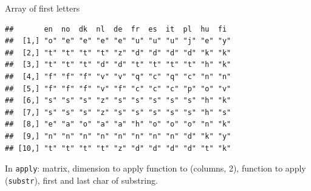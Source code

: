 \begin{frame}[fragile]{Array of first letters}

\begin{knitrout}\small
{}\color{fgcolor}\begin{kframe}
\begin{alltt}
\hlkwb{=}\hlstd{,}\hlstd{)}
\end{alltt}
\begin{verbatim}
##       en  no  dk  nl  de  fr  es  it  pl  hu  fi 
##  [1,] "o" "e" "e" "e" "e" "u" "u" "u" "j" "e" "y"
##  [2,] "t" "t" "t" "t" "z" "d" "d" "d" "d" "k" "k"
##  [3,] "t" "t" "t" "d" "d" "t" "t" "t" "t" "h" "k"
##  [4,] "f" "f" "f" "v" "v" "q" "c" "q" "c" "n" "n"
##  [5,] "f" "f" "f" "v" "f" "c" "c" "c" "p" "o" "v"
##  [6,] "s" "s" "s" "z" "s" "s" "s" "s" "s" "h" "k"
##  [7,] "s" "s" "s" "z" "s" "s" "s" "s" "s" "h" "s"
##  [8,] "e" "a" "o" "a" "a" "h" "o" "o" "o" "n" "k"
##  [9,] "n" "n" "n" "n" "n" "n" "n" "n" "d" "k" "y"
## [10,] "t" "t" "t" "t" "z" "d" "d" "d" "d" "t" "k"
\end{verbatim}
\end{kframe}
\end{knitrout}

In \texttt{apply}: matrix, dimension to apply function to (columns, 2),
function to apply (\texttt{substr}), first and last char of substring.
  
\end{frame}

